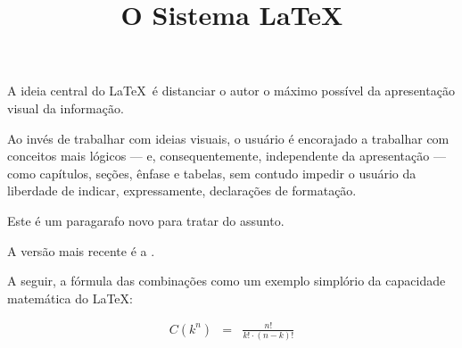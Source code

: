 \documentclass[12pt,a4paper]{article}
\title{O Sistema \LaTeX}
\begin{document}
	\maketitle
	A ideia central do \LaTeX\ é distanciar o autor
	o máximo possível da apresentação visual da informação.
	
	Ao invés de trabalhar com ideias visuais, o usuário é
	encorajado a trabalhar com conceitos mais lógicos --- e,
	consequentemente, independente da apresentação --- como capítulos,
	seções, ênfase e tabelas, sem contudo impedir o usuário da
	liberdade de indicar, expressamente, declarações de formatação.

	Este é um paragarafo novo para tratar do assunto.
	
	A versão mais recente é a \LaTeXe.
	
	A seguir, a fórmula das combinações como um exemplo simplório
	da capacidade matemática do \LaTeX:
	
	\begin{eqnarray}
	C \left (k^n\right) &=& \frac{n!}{k!\cdot(n-k)!}
	\end{eqnarray}
	  
	
\end{document}
